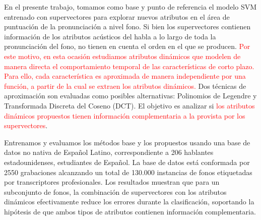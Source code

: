 En el presente trabajo, tomamos como
base y punto de referencia el modelo SVM entrenado con
supervectores para explorar nuevos atributos en el área de puntuación de la
pronunciación a nivel fono.
Si bien los supervectores contienen información de los atributos acústicos del habla a lo
largo de toda la pronunciación del fono, no tienen en cuenta el orden en el que se
producen. \textcolor{red}{Por este motivo, en esta ocasión
estudiamos atributos dinámicos
que modelen \textcolor{red}{de manera directa el comportamiento temporal de las
características de corto plazo}.
Para ello, cada característica es aproximada
de manera independiente por una función,
a partir de la cual se extraen los atributos dinámicos.}
Dos técnicas de aproximación son evaluadas como posibles alternativas:
Polinomios de Legendre y Transformada Discreta del Coseno (DCT).
El objetivo
es analizar si
\textcolor{red}{los atributos dinámicos propuestos tienen información
complementaria a la provista por los supervectores}.


Entrenamos y evaluamos los métodos base y los propuestos usando una base de datos no nativa
de Español Latino, correspondiente a 206 hablantes estadounidenses, estudiantes de Español.
La base de datos está conformada por 2550 grabaciones alcanzando
un total de 130.000 instancias de fonos etiquetadas
por transcriptores profesionales.
Los resultados muestran que para un subconjunto de fonos, la combinación de supervectores
con los atributos dinámicos efectivamente reduce los errores durante la clasificación,
soportando la
hipótesis de que ambos tipos de atributos contienen información complementaria.

